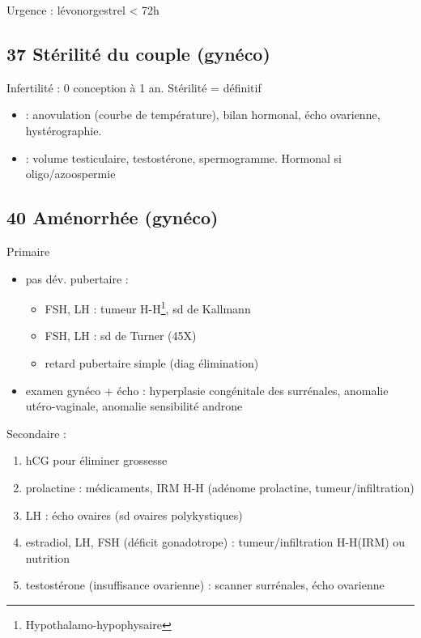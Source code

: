 \documentclass[11pt]{article}
\begin{document}
Urgence : lévonorgestrel < 72h
\subsection{37 Stérilité du couple (gynéco)}
\label{sec:org5efafe3}
Infertilité : 0 conception à 1 an. Stérilité = définitif

\begin{itemize}
\item \female : anovulation (courbe de température), bilan hormonal, écho ovarienne, hystérographie.
\item \male : volume testiculaire, testostérone, spermogramme. Hormonal si oligo/azoospermie
\end{itemize}

\subsection{40 Aménorrhée (gynéco)}
\label{sec:org2182a33}
Primaire
\begin{itemize}
\item pas dév. pubertaire :
\begin{itemize}
\item FSH, LH \dec : tumeur H-H\footnote{Hypothalamo-hypophysaire}, sd de Kallmann
\item FSH, LH \inc : sd de Turner (45X)
\item retard pubertaire simple (diag élimination)
\end{itemize}
\item examen gynéco + écho : hyperplasie congénitale des surrénales, anomalie
utéro-vaginale, anomalie sensibilité androne
\end{itemize}
Secondaire :
\begin{enumerate}
\item hCG pour éliminer grossesse
\item prolactine \inc : médicaments, IRM H-H (adénome prolactine, tumeur/infiltration)
\item LH \inc : écho ovaires (sd ovaires polykystiques)
\item estradiol, LH, FSH \dec (déficit gonadotrope) : tumeur/infiltration H-H(IRM) ou nutrition
\item \inc testostérone (insuffisance ovarienne) : scanner surrénales, écho ovarienne
\end{enumerate}
\end{document}
